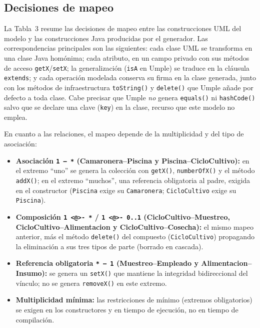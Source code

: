 \subsection{Decisiones de mapeo}

La Tabla~3 resume las decisiones de mapeo entre las construcciones UML
del modelo y las construcciones Java producidas por el generador. Las
correspondencias principales son las siguientes: cada clase UML se
transforma en una clase Java homónima; cada atributo, en un campo
privado con sus métodos de acceso \texttt{getX}/\texttt{setX}; la
generalización (\texttt{isA} en Umple) se traduce en la cláusula
\texttt{extends}; y cada operación modelada conserva su firma en la
clase generada, junto con los métodos de infraestructura
\texttt{toString()} y \texttt{delete()} que Umple añade por defecto a
toda clase. Cabe precisar que Umple \emph{no} genera \texttt{equals()}
ni \texttt{hashCode()} salvo que se declare una clave (\texttt{key})
en la clase, recurso que este modelo no emplea.

En cuanto a las relaciones, el mapeo depende de la multiplicidad y del
tipo de asociación:

\begin{itemize}
  \item \textbf{Asociación \texttt{1 -- *} (Camaronera--Piscina y
        Piscina--CicloCultivo):} en el extremo ``uno'' se genera la
        colección con \texttt{getX()}, \texttt{numberOfX()} y el
        método \texttt{addX()}; en el extremo ``muchos'', una
        referencia obligatoria al padre, exigida en el constructor
        (\texttt{Piscina} exige su \texttt{Camaronera};
        \texttt{CicloCultivo} exige su \texttt{Piscina}).
  \item \textbf{Composición \texttt{1 <@>- *} / \texttt{1 <@>- 0..1}
        (CicloCultivo--Muestreo, CicloCultivo--Alimentacion y
        CicloCultivo--Cosecha):} el mismo mapeo anterior, más el
        método \texttt{delete()} del compuesto (\texttt{CicloCultivo})
        propagando la eliminación a sus tres tipos de parte (borrado
        en cascada).
  \item \textbf{Referencia obligatoria \texttt{* -- 1} (Muestreo--Empleado
        y Alimentacion--Insumo):} se genera un \texttt{setX()} que
        mantiene la integridad bidireccional del vínculo; no se genera
        \texttt{removeX()} en este extremo.
  \item \textbf{Multiplicidad mínima:} las restricciones de mínimo
        (extremos obligatorios) se exigen en los constructores y en
        tiempo de ejecución, no en tiempo de compilación.
\end{itemize}

